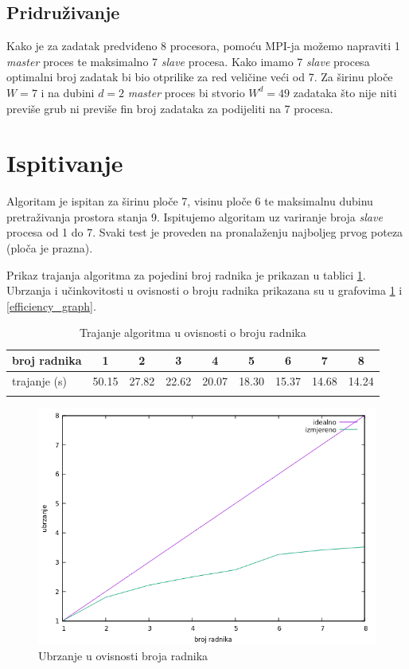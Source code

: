 \documentclass[12pt]{article}
\begin{document}
\subsection{Pridruživanje}
Kako je za zadatak predviđeno 8 procesora, pomoću MPI-ja možemo napraviti 1 \textit{master}
proces te maksimalno 7 \textit{slave} procesa.
Kako imamo 7 \textit{slave} procesa optimalni broj zadatak bi bio otprilike za red veličine
veći od 7.
Za širinu ploče $W = 7$ i na dubini $d = 2$ \textit{master} proces bi stvorio
$W ^ d = 49$ zadataka što nije niti previše grub ni previše fin broj zadataka za podijeliti na 7 procesa.


\section{Ispitivanje} 
Algoritam je ispitan za širinu ploče 7, visinu ploče 6 te maksimalnu dubinu pretraživanja
prostora stanja 9.
Ispitujemo algoritam uz variranje broja \textit{slave} procesa od 1 do 7.
Svaki test je proveden na pronalaženju najboljeg prvog poteza (ploča je prazna).

Prikaz trajanja algoritma za pojedini broj radnika je prikazan u tablici \ref{speed_table}.
Ubrzanja i učinkovitosti u ovisnosti o broju radnika prikazana su u grafovima \ref{speed_graph} i \ref{efficiency_graph}.

\begin{table}
\caption{Trajanje algoritma u ovisnosti o broju radnika}
\begin{center}
\begin{tabular}{ | l | c | c | c | c | c | c | c | c |}
\hline
 broj radnika & 1 & 2 & 3 & 4 & 5 & 6 & 7 & 8\\ 
\hline
 trajanje (s) & 50.15 & 27.82 & 22.62 & 20.07 & 18.30 & 15.37 & 14.68 & 14.24\\
\hline
\label{speed_table}
\end{tabular}
\end{center}
\end{table}

\begin{figure}[h]
\begin{center}
\includegraphics[width=15cm]{speed_graph}
\caption{Ubrzanje u ovisnosti broja radnika}
\label{speed_graph}
\end{center}
\end{figure}
\end{document}
